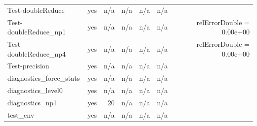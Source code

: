 \begin{table}[tbp]
\begin{tabular}{lrrrrrr}
Test-doubleReduce & yes & n/a & n/a & n/a & n/a &  \\
Test-doubleReduce\_np1 & yes & n/a & n/a & n/a & n/a & relErrorDouble = 0.00e+00 \\
Test-doubleReduce\_np4 & yes & n/a & n/a & n/a & n/a & relErrorDouble = 0.00e+00 \\
Test-precision & yes & n/a & n/a & n/a & n/a &  \\
diagnostics\_force\_stats & yes & n/a & n/a & n/a & n/a &  \\
diagnostics\_level0 & yes & n/a & n/a & n/a & n/a &  \\
diagnostics\_np1 & yes & 20 & n/a & n/a & n/a &  \\
test\_env & yes & n/a & n/a & n/a & n/a &  \\
\bottomrule
\end{tabular}
\end{table}
